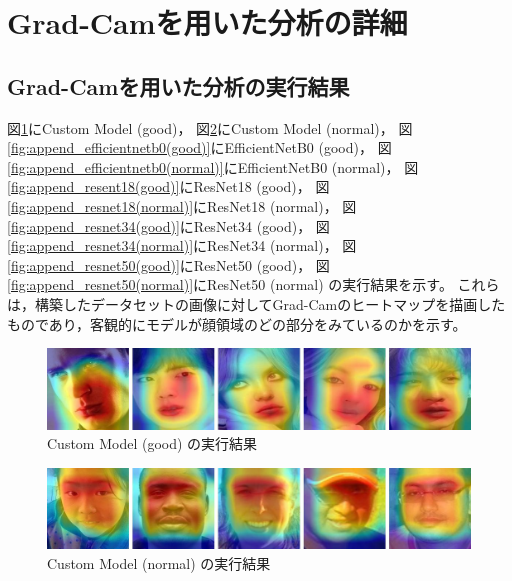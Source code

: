 \documentclass[a4paper,11pt,titlepage]{jsarticle}
\begin{document}
\clearpage
\appendix %
\section{Grad-Camを用いた分析の詳細}

\subsection{Grad-Camを用いた分析の実行結果}

図\ref{fig:append_custom(good)}にCustom Model (good)，
図\ref{fig:append_custom(normal)}にCustom Model (normal)，
図\ref{fig:append_efficientnetb0(good)}にEfficientNetB0 (good)，
図\ref{fig:append_efficientnetb0(normal)}にEfficientNetB0 (normal)，
図\ref{fig:append_resent18(good)}にResNet18 (good)，
図\ref{fig:append_resnet18(normal)}にResNet18 (normal)，
図\ref{fig:append_resnet34(good)}にResNet34 (good)，
図\ref{fig:append_resnet34(normal)}にResNet34 (normal)，
図\ref{fig:append_resnet50(good)}にResNet50 (good)，
図\ref{fig:append_resnet50(normal)}にResNet50 (normal) の実行結果を示す。
これらは，構築したデータセットの画像に対してGrad-Camのヒートマップを描画したものであり，客観的にモデルが顔領域のどの部分をみているのかを示す。

\begin{figure}[H]
    \centering
    \includegraphics[width=1.1\textwidth]{custom(good).jpg}
    \caption{Custom Model (good) の実行結果}
    \label{fig:append_custom(good)}
\end{figure}

\begin{figure}[H]
    \centering
    \includegraphics[width=1.1\textwidth]{custom(normal).jpg}
    \caption{Custom Model (normal) の実行結果}
    \label{fig:append_custom(normal)}
\end{figure}
\end{document}
